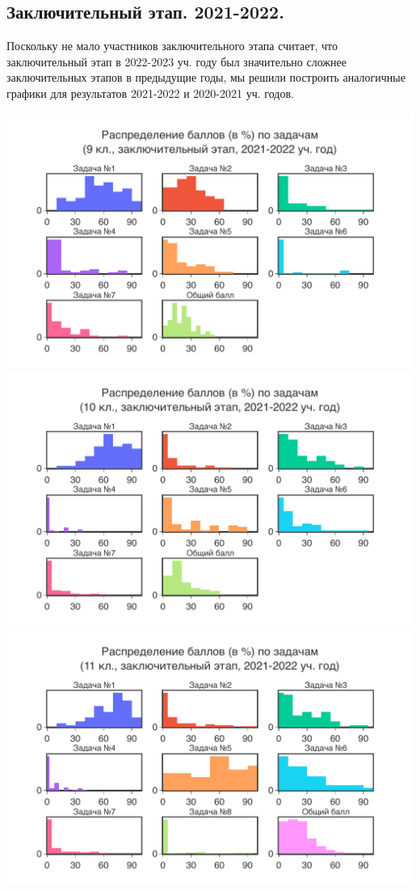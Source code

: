 \newpage
\subsection{Заключительный этап. 2021-2022.}

Поскольку не мало участников заключительного этапа считает, что заключительный этап в 2022-2023 уч. году был значительно сложнее заключительных этапов в предыдущие годы, мы решили построить аналогичные графики для результатов 2021-2022 и 2020-2021 уч. годов.

\includegraphics[width=\linewidth]{../export/pdf/results/2022/respa/grade9-dist-problemwise.pdf}
\includegraphics[width=\linewidth]{../export/pdf/results/2022/respa/grade10-dist-problemwise.pdf}
\includegraphics[width=\linewidth]{../export/pdf/results/2022/respa/grade11-dist-problemwise.pdf}


